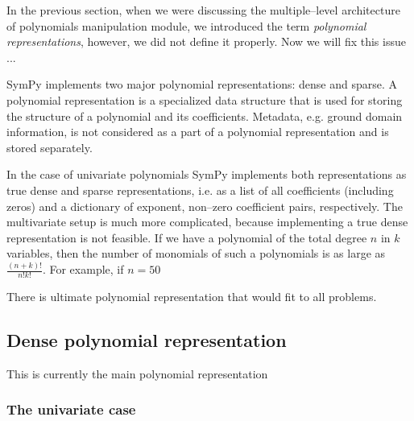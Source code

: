 In the previous section, when we were discussing the multiple--level architecture of polynomials
manipulation module, we introduced the term \emph{polynomial representations}, however, we did not
define it properly. Now we will fix this issue ...

SymPy implements two major polynomial representations: dense and sparse. A polynomial
representation is a specialized data structure that is used for storing the structure
of a polynomial and its coefficients. Metadata, e.g. ground domain information, is not
considered as a part of a polynomial representation and is stored separately.

In the case of univariate polynomials SymPy implements both representations as true dense
and sparse representations, i.e. as a list of all coefficients (including zeros) and a
dictionary of exponent, non--zero coefficient pairs, respectively. The multivariate setup
is much more complicated, because implementing a true dense representation is not feasible.
If we have a polynomial of the total degree $n$ in $k$ variables, then the number of monomials
of such a polynomials is as large as $\frac{(n + k)!}{n! k!}$. For example, if $n = 50$

There is ultimate polynomial representation that would fit to all problems.


\subsection{Dense polynomial representation}

This is currently the main polynomial representation


\subsubsection{The univariate case}


